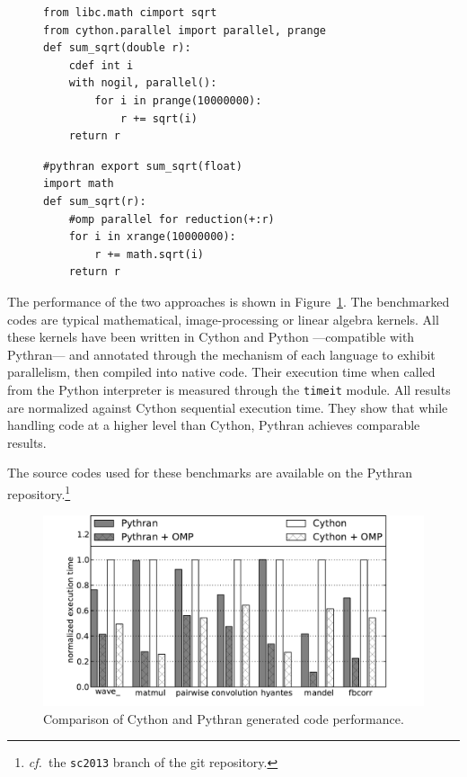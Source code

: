 \documentclass[conference]{IEEEtran}
\newcommand\see{\emph{cf.\ }}
\begin{document}
\begin{figure}

    \begin{lstlisting}[label={lst:cython-sample}, caption={Cython implementation
    of a parallel reduction.}]
from libc.math cimport sqrt
from cython.parallel import parallel, prange
def sum_sqrt(double r):
    cdef int i
    with nogil, parallel():
        for i in prange(10000000):
            r += sqrt(i)
    return r
    \end{lstlisting}
%
    \begin{lstlisting}[label={lst:pythran-sample}, caption={Pythran
      implementation of a parallel reduction.}]
#pythran export sum_sqrt(float)
import math
def sum_sqrt(r):
    #omp parallel for reduction(+:r)
    for i in xrange(10000000):
        r += math.sqrt(i)
    return r
    \end{lstlisting}
\end{figure}


The performance of the two approaches is shown in
Figure~\ref{fig:cython-pythran}.  The benchmarked codes are typical
mathematical, image-processing or linear algebra kernels. All these kernels have
been written in Cython and Python ---compatible with Pythran--- and annotated
through the mechanism of each language to exhibit parallelism, then compiled
into native code.  Their execution time when called from the Python interpreter
is measured through the \texttt{timeit} module. All results are normalized
against Cython sequential execution time. They show that while handling code at
a higher level than Cython, Pythran achieves comparable results.

The source codes used for these benchmarks are available on the Pythran
repository.\footnote{\see the \texttt{sc2013} branch of the git repository.}

\begin{figure}[ht]
    \includegraphics[width=.5\textwidth]{cython}
    \caption{Comparison of Cython and Pythran generated code performance.}
    \label{fig:cython-pythran}
\end{figure}
\end{document}
